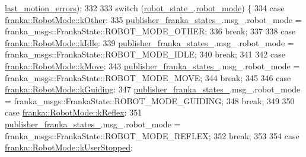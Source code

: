 \begin{DoxyCode}
      \hyperlink{structfranka_1_1RobotState_a06d7019f85339409e932dc086b7a260b}{last\_motion\_errors});
332 
333     \textcolor{keywordflow}{switch} (\hyperlink{classfranka__control_1_1FrankaStateController_a0d097abb2665aadbc8d38662bba5ae8b}{robot\_state\_}.\hyperlink{structfranka_1_1RobotState_a4943ae75e0e2ec534e0afac31cbcc987}{robot\_mode}) \{
334       \textcolor{keywordflow}{case} \hyperlink{namespacefranka_adfe059ae23ebbad59e421edaa879651aa341b8a8f03cf33821c46aa5c3aad4b7a}{franka::RobotMode::kOther}:
335         \hyperlink{classfranka__control_1_1FrankaStateController_a2ec0c84ee9474f84577a740360aae2e3}{publisher\_franka\_states\_}.msg\_.robot\_mode = 
      franka\_msgs::FrankaState::ROBOT\_MODE\_OTHER;
336         \textcolor{keywordflow}{break};
337 
338       \textcolor{keywordflow}{case} \hyperlink{namespacefranka_adfe059ae23ebbad59e421edaa879651aaf5137a026a4b2f3b1c8a21cfc60dd14b}{franka::RobotMode::kIdle}:
339         \hyperlink{classfranka__control_1_1FrankaStateController_a2ec0c84ee9474f84577a740360aae2e3}{publisher\_franka\_states\_}.msg\_.robot\_mode = 
      franka\_msgs::FrankaState::ROBOT\_MODE\_IDLE;
340         \textcolor{keywordflow}{break};
341 
342       \textcolor{keywordflow}{case} \hyperlink{namespacefranka_adfe059ae23ebbad59e421edaa879651aae54c7412401b5e36c1c254e6fb17a3dd}{franka::RobotMode::kMove}:
343         \hyperlink{classfranka__control_1_1FrankaStateController_a2ec0c84ee9474f84577a740360aae2e3}{publisher\_franka\_states\_}.msg\_.robot\_mode = 
      franka\_msgs::FrankaState::ROBOT\_MODE\_MOVE;
344         \textcolor{keywordflow}{break};
345 
346       \textcolor{keywordflow}{case} \hyperlink{namespacefranka_adfe059ae23ebbad59e421edaa879651aa3f62c59dc456d870c5232af7b73944ea}{franka::RobotMode::kGuiding}:
347         \hyperlink{classfranka__control_1_1FrankaStateController_a2ec0c84ee9474f84577a740360aae2e3}{publisher\_franka\_states\_}.msg\_.robot\_mode = 
      franka\_msgs::FrankaState::ROBOT\_MODE\_GUIDING;
348         \textcolor{keywordflow}{break};
349 
350       \textcolor{keywordflow}{case} \hyperlink{namespacefranka_adfe059ae23ebbad59e421edaa879651aa24a5ddd7430a2592185005fce3881f62}{franka::RobotMode::kReflex}:
351         \hyperlink{classfranka__control_1_1FrankaStateController_a2ec0c84ee9474f84577a740360aae2e3}{publisher\_franka\_states\_}.msg\_.robot\_mode = 
      franka\_msgs::FrankaState::ROBOT\_MODE\_REFLEX;
352         \textcolor{keywordflow}{break};
353 
354       \textcolor{keywordflow}{case} \hyperlink{namespacefranka_adfe059ae23ebbad59e421edaa879651aaaef321f1c9c879b98c2bcd307ad2305f}{franka::RobotMode::kUserStopped}:

\end{DoxyCode}
